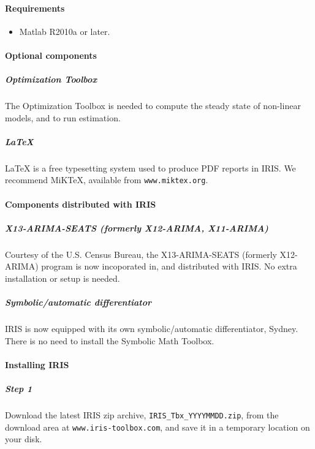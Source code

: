 

	\paragraph{Requirements}

\begin{itemize}
\itemsep1pt\parskip0pt
\item
  Matlab R2010a or later.
\end{itemize}

\paragraph{Optional components}

\subparagraph{Optimization Toolbox}

The Optimization Toolbox is needed to compute the steady state of
non-linear models, and to run estimation.

\subparagraph{LaTeX}

LaTeX is a free typesetting system used to produce PDF reports in IRIS.
We recommend MiKTeX, available from \texttt{www.miktex.org}.

\paragraph{Components distributed with
IRIS}

\subparagraph{X13-ARIMA-SEATS (formerly X12-ARIMA,
X11-ARIMA)}

Courtesy of the U.S. Census Bureau, the X13-ARIMA-SEATS (formerly
X12-ARIMA) program is now incoporated in, and distributed with IRIS. No
extra installation or setup is needed.

\subparagraph{Symbolic/automatic
differentiator}

IRIS is now equipped with its own symbolic/automatic differentiator,
Sydney. There is no need to install the Symbolic Math Toolbox.

\paragraph{Installing IRIS}

\subparagraph{Step 1}

Download the latest IRIS zip archive, \texttt{IRIS\_Tbx\_YYYYMMDD.zip},
from the download area at \texttt{www.iris-toolbox.com}, and save it in
a temporary location on your disk.

